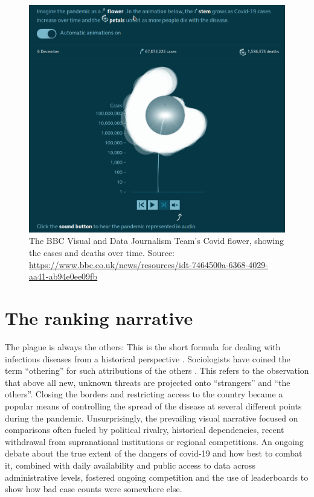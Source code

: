 \documentclass[article]{jdssv}\usepackage[]{graphicx}\usepackage[]{color}
\begin{document}
\begin{figure}
\centering
\includegraphics[width=.8\linewidth]{Figures_Web/BBC_flower_time_series}
\caption{The BBC Visual and Data Journalism Team's Covid flower, showing the cases and deaths over time. Source: \url{https://www.bbc.co.uk/news/resources/idt-7464500a-6368-4029-aa41-ab94e0ee09fb}}\label{fig:bbc-flower}
\end{figure}


\section{The ranking narrative}
\label{sec:rankings}

The plague is always the others: This is the short formula for dealing with infectious diseases from a historical perspective \citep{thiessen2021}. Sociologists have coined the term ``othering'' for such attributions of the others \citep{mountz2009}. This refers to the observation that above all new, unknown threats are projected onto ``strangers'' and ``the others''. Closing the borders and restricting access to the country became a popular means of controlling the spread of the disease at several different points during the pandemic. Unsurprisingly, the prevailing visual narrative focused on comparisons often fueled by political rivalry, historical dependencies, recent withdrawal from supranational institutions or regional competitions. An ongoing debate about the true extent of the dangers of covid-19 and how best to combat it, combined with daily availability and public access to data across administrative levels, fostered ongoing competition and the use of leaderboards to show how bad case counts were somewhere else. 
\end{document}
